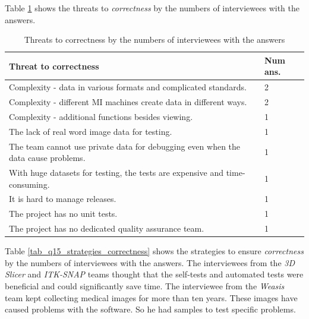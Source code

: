 \documentclass[preprint,12pt,authoryear]{elsarticle}
\begin{document}
Table \ref{tab_q15_threats_correctness} shows the threats to
\textit{correctness} by the numbers of interviewees with the answers.

\begin{table}[ht]
\centering
\hspace*{-1cm}\begin{tabular}{ll}
\hline
Threat to correctness & Num ans. \\ \hline
Complexity - data in various formats and complicated standards. & 2 \\
Complexity - different MI machines create data in different ways. & 2 \\
Complexity - additional functions besides viewing. & 1 \\
The lack of real word image data for testing. & 1 \\
The team cannot use private data for debugging even when the data cause
problems. & 1 \\
With huge datasets for testing, the tests are expensive and time-consuming. & 1 \\
It is hard to manage releases. & 1 \\
The project has no unit tests. & 1 \\
The project has no dedicated quality assurance team. & 1 \\ \hline
\end{tabular}
\caption{\label{tab_q15_threats_correctness}Threats to correctness by the
numbers of interviewees with the answers}
\end{table}

Table \ref{tab_q15_strategies_correctness} shows the strategies to ensure
\textit{correctness} by the numbers of interviewees with the answers. The
interviewees from the \textit{3D Slicer} and \textit{ITK-SNAP} teams thought
that the self-tests and automated tests were beneficial and could significantly
save time. The interviewee from the \textit{Weasis} team kept collecting medical
images for more than ten years. These images have caused problems with the
software. So he had samples to test specific problems.
\end{document}
